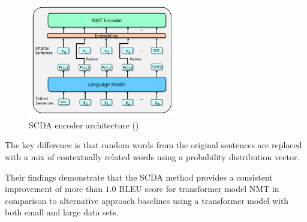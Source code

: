 \begin{figure}[ht!]
\centering
\includegraphics[width=0.58\textwidth]{media/literature/data_argumentation/da_scda.png}
\caption[Diagram of the \acrlong{SCDA} encoder architecture]{\acrlong{SCDA} encoder architecture (\cite{zhu_soft_2019})}
\label{fig:scda}
\end{figure}

The key difference is that random words from the original sentences are replaced with a mix of contextually related words using a probability distribution vector.




Their findings demonstrate that the \acrshort{SCDA} method provides a consistent improvement of more than $1.0$ BLEU score for transformer model \acrshort{NMT} in comparison to alternative approach baselines using a transformer model with both small and large data sets.







